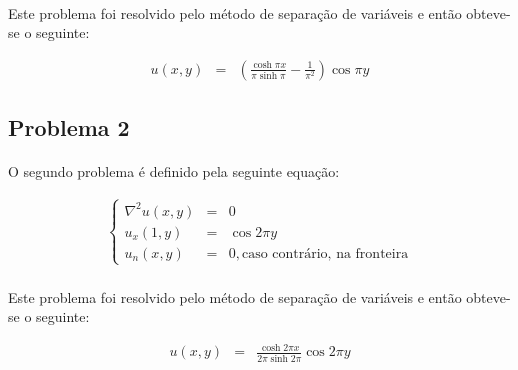 \documentclass[validacao.tex]{subfiles}
\begin{document}
\paragraph{} Este problema foi resolvido pelo método de separação de variáveis e então obteve-se o seguinte:

\begin{eqnarray}
u(x,y) & = & \left(\frac{\cosh \pi x}{\pi \sinh \pi} - \frac{1}{\pi^2}\right)\cos \pi y
\end{eqnarray}

\subsection{Problema 2}

\paragraph{} O segundo problema é definido pela seguinte equação:


\begin{eqnarray}
\left\{\begin{array}{ccl}
\nabla^2u(x,y) & = & 0\\
u_x(1,y) & = & \cos 2\pi y\\
u_n(x,y) & = & 0, \textrm{caso contrário, na fronteira}
\end{array}\right.
\end{eqnarray}

\paragraph{} Este problema foi resolvido pelo método de separação de variáveis e então obteve-se o seguinte:

\begin{eqnarray}
u(x,y) & = & \frac{\cosh 2\pi x}{2\pi \sinh 2\pi}\cos 2 \pi y
\end{eqnarray}
\end{document}
